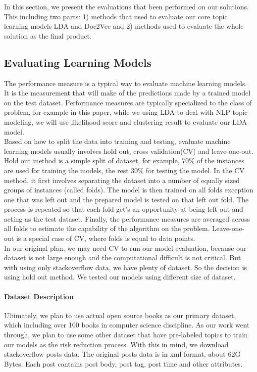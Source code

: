 
In this section, we present the evaluations that been performed on our solutions. This including two parts: 1) methods that used to evaluate our core topic learning models LDA and Doc2Vec and 2) methods used to evaluate the whole solution as the final product. 

\subsection{Evaluating Learning Models}
The performance measure is a typical way to evaluate machine learning models. It is the measurement that will make of the predictions made by a trained model on the test dataset. Performance measures are typically specialized to the class of problem, for example in this paper, while we using LDA  to deal with NLP topic modeling, we will use likelihood score and clustering result to evaluate our LDA model.\\
Based on how to split the data into training and testing, evaluate machine learning models usually involves hold out, cross validation(CV) and leave-one-out. \\
Hold out method is a simple split of dataset, for example, 70\% of the instances are used for training the models, the rest 30\% for testing the model. In the CV method, it first involves separating the dataset into a number of equally sized groups of instances (called folds). The model is then trained on all folds exception one that was left out and the prepared model is tested on that left out fold. The process is repeated so that each fold get's an opportunity at being left out and acting as the test dataset. Finally, the performance measures are averaged across all folds to estimate the capability of the algorithm on the problem.  Leave-one-out is a special case of CV, where folds is equal to data points.\\
In our original plan, we may need CV to run our model evaluation, because our dataset is not large enough and the computational difficult is not critical. But with using only stackoverflow data, we have plenty of dataset. So the decision is using hold out method. We tested our models using different size of dataset. 

\paragraph{Dataset Description} 
Ultimately, we plan to use actual open source books as our primary dataset, which including over 100 books in computer science discipline. As our work went through, we plan to use some other dataset that have pre-labeled topics to train our models as the risk reduction process. With this in mind, we download stackoverflow posts data. The original posts data is in xml format, about 62G Bytes. Each post contains post body, post tag, post time and other attributes.

